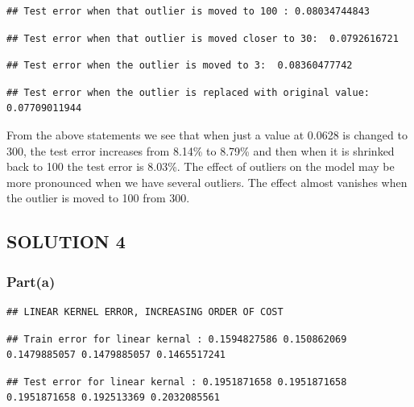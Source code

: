 \documentclass[]{article}
\begin{document}
\begin{verbatim}
## Test error when that outlier is moved to 100 : 0.08034744843
\end{verbatim}

\begin{verbatim}
## Test error when that outlier is moved closer to 30:  0.0792616721
\end{verbatim}

\begin{verbatim}
## Test error when the outlier is moved to 3:  0.08360477742
\end{verbatim}

\begin{verbatim}
## Test error when the outlier is replaced with original value:  0.07709011944
\end{verbatim}

From the above statements we see that when just a value at 0.0628 is
changed to 300, the test error increases from 8.14\% to 8.79\% and then
when it is shrinked back to 100 the test error is 8.03\%. The effect of
outliers on the model may be more pronounced when we have several
outliers. The effect almost vanishes when the outlier is moved to 100
from 300.

\subsection{SOLUTION 4}\label{solution-4}

\subsubsection{Part(a)}\label{parta}

\begin{verbatim}
## LINEAR KERNEL ERROR, INCREASING ORDER OF COST
\end{verbatim}

\begin{verbatim}
## Train error for linear kernal : 0.1594827586 0.150862069 0.1479885057 0.1479885057 0.1465517241
\end{verbatim}

\begin{verbatim}
## Test error for linear kernal : 0.1951871658 0.1951871658 0.1951871658 0.192513369 0.2032085561
\end{verbatim}
\end{document}
